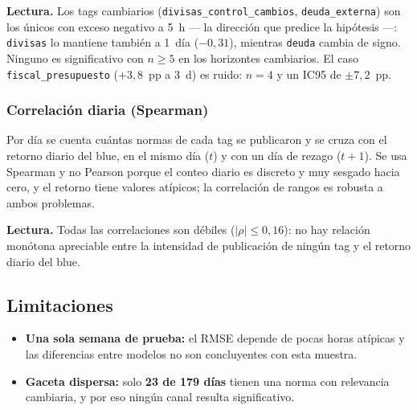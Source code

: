 \textbf{Lectura.} Los tags cambiarios (\texttt{divisas\_control\_cambios},
\texttt{deuda\_externa}) son los únicos con exceso negativo a 5~h --- la
dirección que predice la hipótesis ---: \texttt{divisas} lo mantiene también a
1~día ($-0{,}31$), mientras \texttt{deuda} cambia de signo. Ninguno es
significativo con $n \geq 5$ en los horizontes cambiarios. El caso
\texttt{fiscal\_presupuesto} ($+3{,}8$~pp a 3~d) es ruido: $n=4$ y un IC95 de
$\pm7{,}2$~pp.

\subsubsection{Correlación diaria (Spearman)}

Por día se cuenta cuántas normas de cada tag se publicaron y se cruza con el
retorno diario del blue, en el mismo día ($t$) y con un día de rezago
($t{+}1$). Se usa Spearman y no Pearson porque el conteo diario es discreto y
muy sesgado hacia cero, y el retorno tiene valores atípicos; la correlación de
rangos es robusta a ambos problemas.

\textbf{Lectura.} Todas las correlaciones son débiles ($|\rho| \leq 0{,}16$):
no hay relación monótona apreciable entre la intensidad de publicación de
ningún tag y el retorno diario del blue.

\FloatBarrier
\subsection{Limitaciones}

\begin{itemize}
  \item \textbf{Una sola semana de prueba:} el RMSE depende de pocas horas
        atípicas y las diferencias entre modelos no son concluyentes con esta
        muestra.
  \item \textbf{Gaceta dispersa:} solo \textbf{23 de 179 días} tienen una norma
        con relevancia cambiaria, y por eso ningún canal resulta significativo.
\end{itemize}
